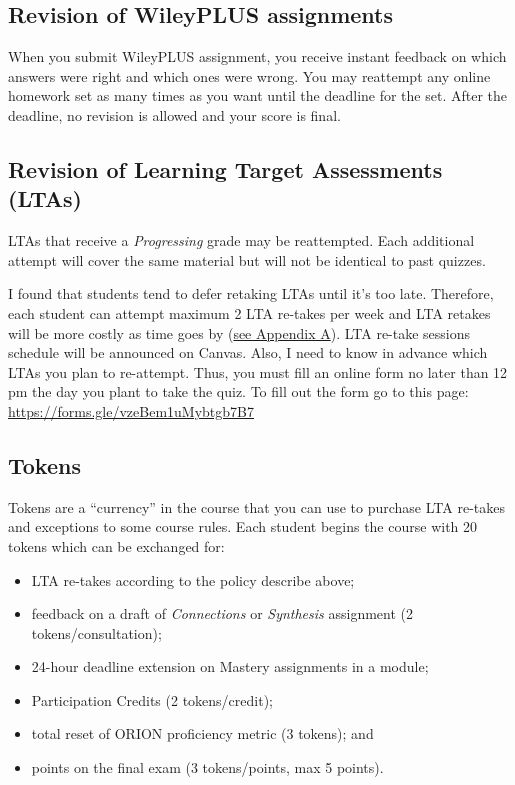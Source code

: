 \hypertarget{revision-of-wileyplus-assignments}{%
\subsection{Revision of WileyPLUS
assignments}\label{revision-of-wileyplus-assignments}}

When you submit WileyPLUS assignment, you receive instant feedback on
which answers were right and which ones were wrong. You may reattempt
any online homework set as many times as you want until the deadline for
the set. After the deadline, no revision is allowed and your score is
final.

\hypertarget{revision-of-learning-target-assessments-ltas}{%
\subsection{Revision of Learning Target Assessments
(LTAs)}\label{revision-of-learning-target-assessments-ltas}}

LTAs that receive a \emph{Progressing} grade may be reattempted. Each
additional attempt will cover the same material but will not be
identical to past quizzes.

I found that students tend to defer retaking LTAs until it's too late.
Therefore, each student can attempt maximum 2 LTA re-takes per week and
LTA retakes will be more costly as time goes by
(\protect\hyperlink{lta-cost}{see Appendix A}). LTA re-take sessions
schedule will be announced on Canvas. Also, I need to know in advance
which LTAs you plan to re-attempt. Thus, you must fill an online form no
later than 12 pm the day you plant to take the quiz. To fill out the
form go to this page: \url{https://forms.gle/vzeBem1uMybtgb7B7}

\hypertarget{tokens}{%
\subsection{Tokens}\label{tokens}}

Tokens are a ``currency'' in the course that you can use to purchase LTA
re-takes and exceptions to some course rules. Each student begins the
course with 20 tokens which can be exchanged for:

\begin{itemize}
\tightlist
\item
  LTA re-takes according to the policy describe above;
\item
  feedback on a draft of \emph{Connections} or \emph{Synthesis}
  assignment (2 tokens/consultation);
\item
  24-hour deadline extension on Mastery assignments in a module;
\item
  Participation Credits (2 tokens/credit);
\item
  total reset of ORION proficiency metric (3 tokens); and
\item
  points on the final exam (3 tokens/points, max 5 points).
\end{itemize}

